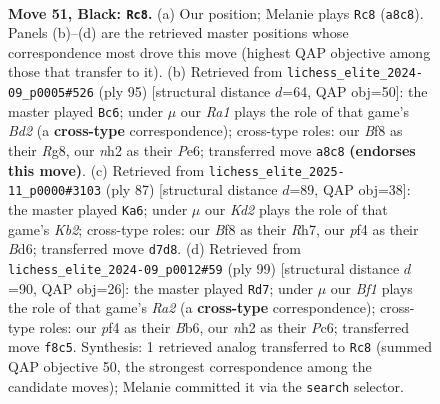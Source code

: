 \documentclass[11pt]{article}
\begin{document}
\clearpage

\begin{figure}[p]\centering
\begin{subfigure}{0.46\textwidth}\centering
\resizebox{\linewidth}{!}{%
\newchessgame
\chessboard[
  setfen={r4b1r/3k2p1/p1p5/Pp1bBp1p/2p2P1P/4P1P1/1P5N/R1K3R1 b - - 4 51},
  showmover=false,
  pgfstyle=straightmove, color=movearrow, markmove={a8-c8}
]}
\caption{}
\end{subfigure}\hfill
\begin{subfigure}{0.46\textwidth}\centering
\resizebox{\linewidth}{!}{%
\newchessgame
\chessboard[
  setfen={4r1r1/2kb1p2/4p1p1/1p1pP2p/pP3P2/P1PR2P1/4B2P/2K4R b - - 36 48},
  showmover=false,
  pgfstyle=straightmove, color=movearrow, markmove={d7-c6}
]}
\caption{}
\end{subfigure}
\\[4pt]
\begin{subfigure}{0.46\textwidth}\centering
\resizebox{\linewidth}{!}{%
\newchessgame
\chessboard[
  setfen={6r1/1kp4r/1p1b4/3Pp2p/2R1Pp2/pP3P2/P5PR/4BK2 b - - 14 44},
  showmover=false,
  pgfstyle=straightmove, color=movearrow, markmove={b7-a6}
]}
\caption{}
\end{subfigure}\hfill
\begin{subfigure}{0.46\textwidth}\centering
\resizebox{\linewidth}{!}{%
\newchessgame
\chessboard[
  setfen={8/r5pk/1bp2p2/pr2pPp1/4P1K1/1PRP3P/R3N1P1/8 b - - 5 50},
  showmover=false,
  pgfstyle=straightmove, color=movearrow, markmove={a7-d7}
]}
\caption{}
\end{subfigure}
\caption{\textbf{Move 51, Black: \texttt{Rc8}.} (a) Our position; Melanie plays \texttt{Rc8} (\texttt{a8c8}). Panels (b)--(d) are the retrieved master positions whose correspondence most drove this move (highest QAP objective among those that transfer to it). (b) Retrieved from \texttt{lichess\_elite\_2024-09\_p0005\#526} (ply 95) [structural distance $d$=64, QAP obj=50]: the master played \texttt{Bc6}; under $\mu$ our \emph{Ra1} plays the role of that game's \emph{Bd2} (a \textbf{cross-type} correspondence); cross-type roles: our \emph{B}f8 as their \emph{R}g8, our \emph{n}h2 as their \emph{P}e6; transferred move \texttt{a8c8} \textbf{(endorses this move)}. (c) Retrieved from \texttt{lichess\_elite\_2025-11\_p0000\#3103} (ply 87) [structural distance $d$=89, QAP obj=38]: the master played \texttt{Ka6}; under $\mu$ our \emph{Kd2} plays the role of that game's \emph{Kb2}; cross-type roles: our \emph{B}f8 as their \emph{R}h7, our \emph{p}f4 as their \emph{B}d6; transferred move \texttt{d7d8}. (d) Retrieved from \texttt{lichess\_elite\_2024-09\_p0012\#59} (ply 99) [structural distance $d$=90, QAP obj=26]: the master played \texttt{Rd7}; under $\mu$ our \emph{Bf1} plays the role of that game's \emph{Ra2} (a \textbf{cross-type} correspondence); cross-type roles: our \emph{p}f4 as their \emph{B}b6, our \emph{n}h2 as their \emph{P}c6; transferred move \texttt{f8c5}. Synthesis: 1 retrieved analog transferred to \texttt{Rc8} (summed QAP objective 50, the strongest correspondence among the candidate moves); Melanie committed it via the \texttt{search} selector.}
\label{fig:thought-m101}
\end{figure}
\end{document}
